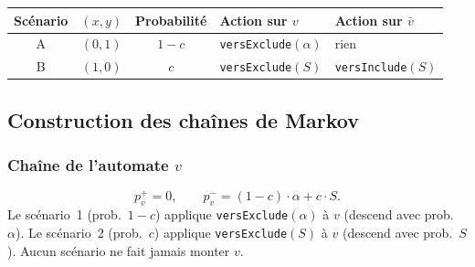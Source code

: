 \documentclass[12pt,a4paper]{article}
\theoremstyle{remark}
\newcommand{\vbar}{\bar{v}}
\begin{document}
\begin{center}
\begin{tabular}{cccll}
\toprule
Scénario & $(x,y)$ & Probabilité & Action sur $v$ & Action sur $\vbar$ \\
\midrule
A & $(0,1)$ & $1-c$ & \texttt{versExclude}$(\alpha)$ & rien \\
B & $(1,0)$ & $c$   & \texttt{versExclude}$(S)$ & \texttt{versInclude}$(S)$ \\
\bottomrule
\end{tabular}
\end{center}

\subsection{Construction des chaînes de Markov}

\subsubsection*{Chaîne de l'automate $v$}

\[
  \boxed{p^+_v = 0, \qquad p^-_v = (1-c)\cdot \alpha + c\cdot S.}
\]
Le scénario~1 (prob.\ $1-c$) applique \texttt{versExclude}$(\alpha)$ à $v$
(descend avec prob.\ $\alpha$).
Le scénario~2 (prob.\ $c$) applique \texttt{versExclude}$(S)$ à $v$
(descend avec prob.\ $S$).
Aucun scénario ne fait jamais monter $v$.
\end{document}
